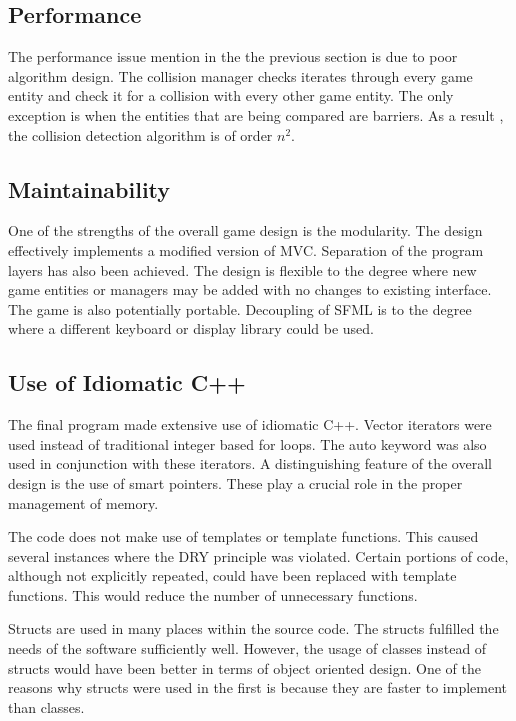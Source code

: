 \documentclass[10pt,twocolumn]{witseiepaper}
\begin{document}
\subsection{Performance}
The performance issue mention in the the previous section is due to poor algorithm design. The collision manager checks iterates through every game entity and check it for a collision with every other game entity. The only exception is when the entities that are being compared are barriers. As a result , the collision detection algorithm is of order $ n^{2} $.


\subsection{Maintainability}
One of the strengths of the overall game design is the modularity. The design effectively implements a modified version of MVC. Separation of the program layers has also been achieved. The design is flexible to the degree where new game entities or managers may be added with no changes to existing interface. The game is also potentially portable. Decoupling of SFML is to the degree where a different keyboard or display library could be used. 

\subsection{Use of Idiomatic C++}
The final program made extensive use of idiomatic C++. Vector iterators were used instead of traditional integer based for loops. The auto keyword was also used in conjunction with these iterators. A distinguishing feature of the overall design is the use of smart pointers. These play a crucial role in the proper management of memory.

The code does not make use of templates or template functions. This caused several instances where the DRY principle was violated. Certain portions of code, although not explicitly repeated, could have been replaced with template functions. This would reduce the number of unnecessary functions.

Structs are used in many places within the source code. The structs fulfilled the needs of the software sufficiently well. However, the usage of classes instead of structs would have been better in terms of object oriented design. One of the reasons why structs were used in the first is because they are faster to implement than classes.
\end{document}

